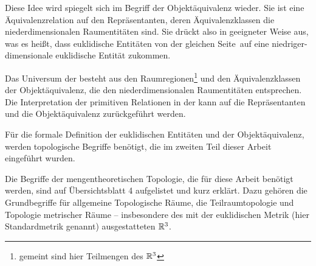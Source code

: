     Diese Idee wird spiegelt sich im Begriff der Objektäquivalenz wieder. 
    Sie ist eine Äquivalenzrelation auf den Repräsentanten, deren Äquivalenzklassen die niederdimensionalen Raumentitäten sind.
    Sie drückt also in geeigneter Weise aus, was es heißt, dass euklidische Entitäten \glqq von der gleichen Seite\grqq\ auf eine niedriger-dimensionale euklidische Entität zukommen.
    
    Das
    Universum der \strukt besteht aus den Raumregionen\footnote{gemeint sind hier Teilmengen des $\mathbb{R}^3$} und den Äquivalenzklassen der Objektäquivalenz, die den niederdimensionalen Raumentitäten entsprechen.
    Die Interpretation der primitiven Relationen  in der \strukt kann auf die Repräsentanten und die Objektäquivalenz zurückgeführt werden.
    
    Für
    die formale Definition der euklidischen Entitäten und der Objektäquivalenz, werden topologische Begriffe benötigt, die im zweiten Teil dieser Arbeit eingeführt wurden.
    
    Die
    Begriffe der mengentheoretischen Topologie, die für diese Arbeit benötigt werden, sind auf Übersichtsblatt 4 aufgelistet und kurz erklärt.
    Dazu gehören die Grundbegriffe für allgemeine Topologische Räume, die Teilraumtopologie und Topologie metrischer Räume -- insbesondere des mit der euklidischen Metrik (hier Standardmetrik genannt) ausgestatteten $\mathbb{R}^3$.
    

